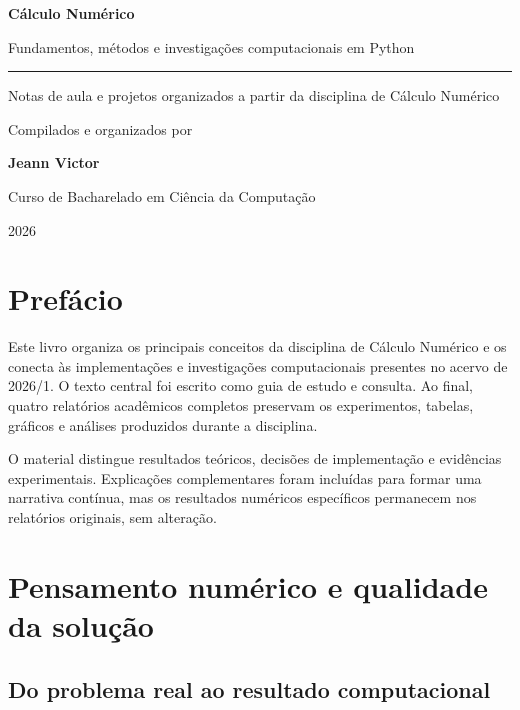 \documentclass[12pt,a4paper,openany]{book}
\begin{document}
\begin{titlepage}
\centering
\vspace*{3cm}
{\Huge\bfseries\color{azullivro} Cálculo Numérico\par}
\vspace{1cm}
{\LARGE\color{laranjalivro} Fundamentos, métodos e investigações computacionais em Python\par}
\vspace{2cm}\rule{0.65\textwidth}{0.4pt}\par\vspace{1.5cm}
{\Large Notas de aula e projetos organizados a partir da disciplina de Cálculo Numérico\par}
\vspace{1cm}
{\large Compilados e organizados por\par}\vspace{0.3cm}
{\Large\bfseries Jeann Victor\par}
\vfill
{\large Curso de Bacharelado em Ciência da Computação\par}
{\large 2026\par}
\end{titlepage}
\frontmatter
\chapter*{Prefácio}
Este livro organiza os principais conceitos da disciplina de Cálculo Numérico e os conecta às implementações e investigações computacionais presentes no acervo de 2026/1. O texto central foi escrito como guia de estudo e consulta. Ao final, quatro relatórios acadêmicos completos preservam os experimentos, tabelas, gráficos e análises produzidos durante a disciplina.

O material distingue resultados teóricos, decisões de implementação e evidências experimentais. Explicações complementares foram incluídas para formar uma narrativa contínua, mas os resultados numéricos específicos permanecem nos relatórios originais, sem alteração.
\tableofcontents
\mainmatter
\chapter{Pensamento numérico e qualidade da solução}



\section{Do problema real ao resultado computacional}
\end{document}
